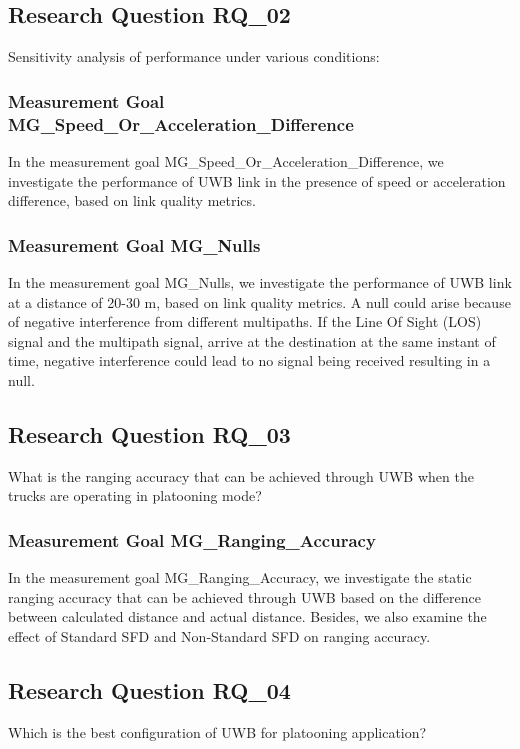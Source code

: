 \subsection{Research Question RQ\_02}
Sensitivity analysis of performance under various conditions:

\subsubsection{Measurement Goal MG\_Speed\_Or\_Acceleration\_Difference}
In the measurement goal MG\_Speed\_Or\_Acceleration\_Difference, we investigate the performance of UWB link in the presence of speed or acceleration difference, based on link quality metrics.

\subsubsection{Measurement Goal MG\_Nulls}
In the measurement goal MG\_Nulls, we investigate the performance of UWB link at a distance of 20-30 m, based on link quality metrics. A null could arise because of negative interference from different multipaths. If the Line Of Sight (LOS) signal and the multipath signal, arrive at the destination at the same instant of time, negative interference could lead to no signal being received resulting in a null.

\subsection{Research Question RQ\_03}
What is the ranging accuracy that can be achieved through UWB when the trucks are operating in platooning mode?

\subsubsection{Measurement Goal MG\_Ranging\_Accuracy}
In the measurement goal MG\_Ranging\_Accuracy, we investigate the static ranging accuracy that can be achieved through UWB based on the difference between calculated distance and actual distance. Besides, we also examine the effect of Standard SFD and Non-Standard SFD on ranging accuracy.

\subsection{Research Question RQ\_04}
Which is the best configuration of UWB for platooning application?


